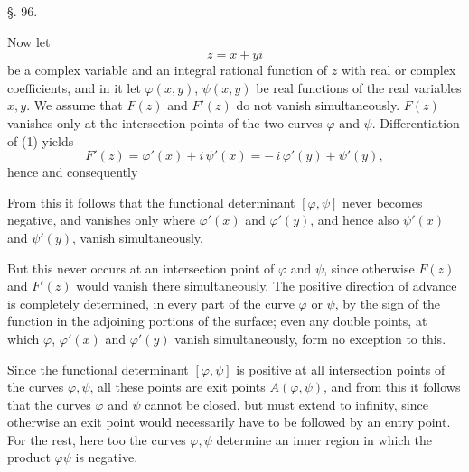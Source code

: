 \begin{center}
§. 96.

\end{center}

Now let
\[
z = x + y i
\]
be a complex variable and
an integral rational function of $z$ with real or complex coefficients, and in it let $\varphi(x,y)$, $\psi(x,y)$ be real functions of the real variables $x, y$. We assume that $F(z)$ and $F'(z)$ do not vanish simultaneously. $F(z)$ vanishes only at the intersection points of the two curves $\varphi$ and $\psi$. Differentiation of (1) yields
\[
F'(z) = \varphi'(x) + i\,\psi'(x) = -\,i\,\varphi'(y) + \psi'(y),
\]
hence
and consequently

From this it follows that the functional determinant $[\varphi,\psi]$ never becomes negative, and vanishes only where $\varphi'(x)$ and $\varphi'(y)$, and hence also $\psi'(x)$ and $\psi'(y)$, vanish simultaneously.

But this never occurs at an intersection point of $\varphi$ and $\psi$, since otherwise $F(z)$ and $F'(z)$ would vanish there simultaneously. The positive direction of advance is completely determined, in every part of the curve $\varphi$ or $\psi$, by the sign of the function in the adjoining portions of the surface; even any double points, at which $\varphi$, $\varphi'(x)$ and $\varphi'(y)$ vanish simultaneously, form no exception to this.

Since the functional determinant $[\varphi,\psi]$ is positive at all intersection points of the curves $\varphi, \psi$, all these points are exit points $A(\varphi,\psi)$, and from this it follows that the curves $\varphi$ and $\psi$ cannot be closed, but must extend to infinity, since otherwise an exit point would necessarily have to be followed by an entry point. For the rest, here too the curves $\varphi, \psi$ determine an inner region in which the product $\varphi\psi$ is negative.
